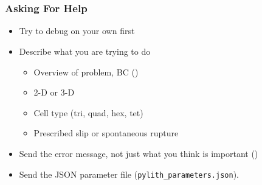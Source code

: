 \documentclass{beamer}
\begin{document}
\section{}
\subsection{}

\begin{frame}
  \frametitle{Asking For Help}

  \begin{itemize}
  \item Try to debug on your own first
  \item Describe what you are trying to do
    \begin{itemize}
    \item Overview of problem, BC ()
    \item 2-D or 3-D
    \item Cell type (tri, quad, hex, tet)
    \item Prescribed slip or spontaneous rupture
    \end{itemize}
  \item Send the  error message, not just what you think
    is important ({\bfseries{}})
  \item Send the JSON parameter file ({\tt pylith\_parameters.json}).
  \end{itemize}
  
\end{frame}




\end{document}
